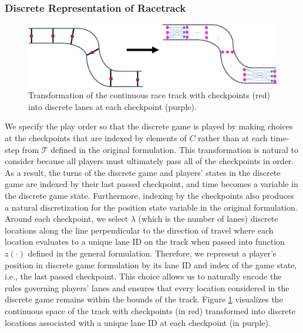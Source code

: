 \subsubsection{Discrete Representation of Racetrack}
\begin{figure}
\begin{center}
   \includegraphics[width=\textwidth]{Figures/TrackAbstraction.png}
\caption[Transformation of racetrack in original formulation to discrete formulation.]{Transformation of the continuous race track with checkpoints (red) into discrete lanes at each checkpoint (purple).}
\label{fig:racetrack_abs}
\end{center}
\end{figure}
We specify the play order so that the discrete game is played by making choices at the checkpoints that are indexed by elements of $C$ rather than at each time-step from $\mathcal{T}$ defined in the original formulation. This transformation is natural to consider because all players must ultimately pass all of the checkpoints in order. As a result, the turns of the discrete game and players' states in the discrete game are indexed by their last passed checkpoint, and time becomes a variable in the discrete game state. Furthermore, indexing by the checkpoints also produces a natural discretization for the position state variable in the original formulation. Around each checkpoint, we select $\lambda$ (which is the number of lanes) discrete locations along the line perpendicular to the direction of travel where each location evaluates to a unique lane ID on the track when passed into function $z(\cdot)$ defined in the general formulation. Therefore, we represent a player's position in discrete game formulation by its lane ID and index of the game state, i.e., the last passed checkpoint. This choice allows us to naturally encode the rules governing players' lanes and ensures that every location considered in the discrete game remains within the bounds of the track. Figure \ref{fig:racetrack_abs} visualizes the continuous space of the track with checkpoints (in red) transformed into discrete locations associated with a unique lane ID at each checkpoint (in purple). 

